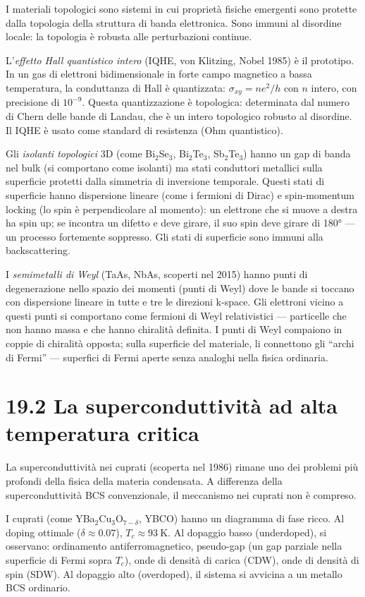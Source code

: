 \documentclass[11.5pt,a4paper,openany]{book}
\theoremstyle{remark}
\begin{document}
I materiali topologici sono sistemi in cui proprietà fisiche emergenti sono protette dalla topologia della struttura di banda elettronica. Sono immuni al disordine locale: la topologia è robusta alle perturbazioni continue.

L'\textit{effetto Hall quantistico intero} (IQHE, von Klitzing, Nobel 1985) è il prototipo. In un gas di elettroni bidimensionale in forte campo magnetico a bassa temperatura, la conduttanza di Hall è quantizzata: $\sigma_{xy} = ne^2/h$ con $n$ intero, con precisione di $10^{-9}$. Questa quantizzazione è topologica: determinata dal numero di Chern delle bande di Landau, che è un intero topologico robusto al disordine. Il IQHE è usato come standard di resistenza (Ohm quantistico).

Gli \textit{isolanti topologici} 3D (come Bi$_2$Se$_3$, Bi$_2$Te$_3$, Sb$_2$Te$_3$) hanno un gap di banda nel bulk (si comportano come isolanti) ma stati conduttori metallici sulla superficie protetti dalla simmetria di inversione temporale. Questi stati di superficie hanno dispersione lineare (come i fermioni di Dirac) e spin-momentum locking (lo spin è perpendicolare al momento): un elettrone che si muove a destra ha spin up; se incontra un difetto e deve girare, il suo spin deve girare di 180° --- un processo fortemente soppresso. Gli stati di superficie sono immuni alla backscattering.

I \textit{semimetalli di Weyl} (TaAs, NbAs, scoperti nel 2015) hanno punti di degenerazione nello spazio dei momenti (punti di Weyl) dove le bande si toccano con dispersione lineare in tutte e tre le direzioni k-space. Gli elettroni vicino a questi punti si comportano come fermioni di Weyl relativistici --- particelle che non hanno massa e che hanno chiralità definita. I punti di Weyl compaiono in coppie di chiralità opposta; sulla superficie del materiale, li connettono gli ``archi di Fermi'' --- superfici di Fermi aperte senza analoghi nella fisica ordinaria.

\section{19.2 La superconduttività ad alta temperatura critica}

La superconduttività nei cuprati (scoperta nel 1986) rimane uno dei problemi più profondi della fisica della materia condensata. A differenza della superconduttività BCS convenzionale, il meccanismo nei cuprati non è compreso.

I cuprati (come YBa$_2$Cu$_3$O$_{7-\delta}$, YBCO) hanno un diagramma di fase ricco. Al doping ottimale ($\delta \approx 0.07$), $T_c \approx 93\ \text{K}$. Al dopaggio basso (underdoped), si osservano: ordinamento antiferromagnetico, pseudo-gap (un gap parziale nella superficie di Fermi sopra $T_c$), onde di densità di carica (CDW), onde di densità di spin (SDW). Al dopaggio alto (overdoped), il sistema si avvicina a un metallo BCS ordinario.
\end{document}

